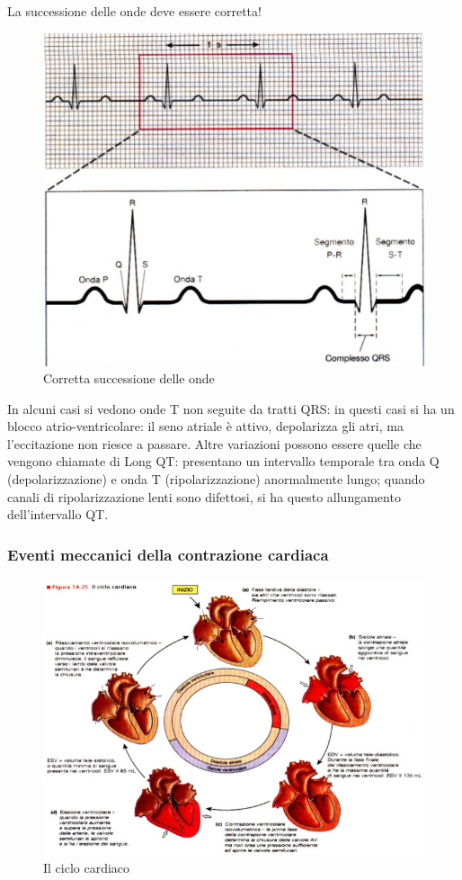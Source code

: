 \documentclass[a4paper,12pt]{article}
\begin{document}
La successione delle onde deve essere corretta! 
\begin{figure}[H]
\centering
\includegraphics[scale=0.4]{immagine/qrs.jpg}
\caption{Corretta successione delle onde}
\end{figure}

In alcuni casi si vedono onde T non seguite da tratti QRS: in questi casi si ha un blocco atrio-ventricolare: il seno atriale è attivo, depolarizza gli atri, ma l'eccitazione non riesce a passare. Altre variazioni possono essere quelle che vengono chiamate di Long QT: presentano un intervallo temporale tra onda Q (depolarizzazione) e onda T (ripolarizzazione) anormalmente lungo; quando canali di ripolarizzazione lenti sono difettosi, si ha questo allungamento dell'intervallo QT.

\subsubsection{Eventi meccanici della contrazione cardiaca}
\begin{figure}[H]
\centering
\includegraphics[scale=0.4]{immagine/meccanici.jpg}
\caption{Il ciclo cardiaco}
\end{figure}
\end{document}
